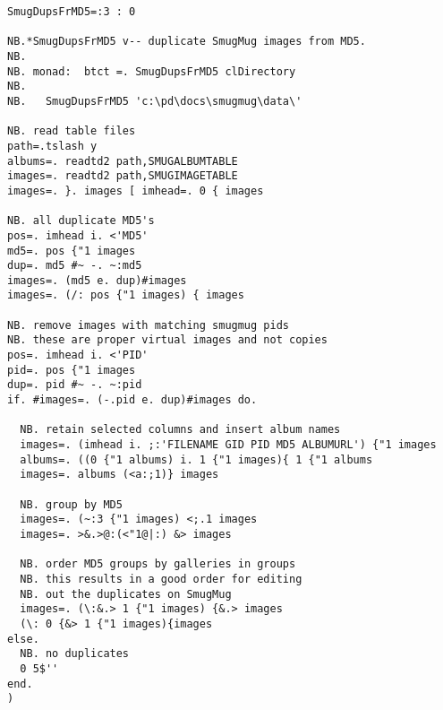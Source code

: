 \begin{tcolorbox}[breakable, size=fbox, boxrule=1pt, pad at break*=1mm,colback=cellbackground, colframe=cellborder]
\begin{lstlisting}[language=jdoc, frame=single,framerule=0pt,label=lst:scr369X0]
SmugDupsFrMD5=:3 : 0

NB.*SmugDupsFrMD5 v-- duplicate SmugMug images from MD5.
NB.
NB. monad:  btct =. SmugDupsFrMD5 clDirectory
NB.
NB.   SmugDupsFrMD5 'c:\pd\docs\smugmug\data\'

NB. read table files
path=.tslash y
albums=. readtd2 path,SMUGALBUMTABLE
images=. readtd2 path,SMUGIMAGETABLE
images=. }. images [ imhead=. 0 { images

NB. all duplicate MD5's
pos=. imhead i. <'MD5'
md5=. pos {"1 images
dup=. md5 #~ -. ~:md5
images=. (md5 e. dup)#images
images=. (/: pos {"1 images) { images

NB. remove images with matching smugmug pids
NB. these are proper virtual images and not copies
pos=. imhead i. <'PID'
pid=. pos {"1 images
dup=. pid #~ -. ~:pid
if. #images=. (-.pid e. dup)#images do.

  NB. retain selected columns and insert album names
  images=. (imhead i. ;:'FILENAME GID PID MD5 ALBUMURL') {"1 images
  albums=. ((0 {"1 albums) i. 1 {"1 images){ 1 {"1 albums
  images=. albums (<a:;1)} images

  NB. group by MD5
  images=. (~:3 {"1 images) <;.1 images
  images=. >&.>@:(<"1@|:) &> images

  NB. order MD5 groups by galleries in groups
  NB. this results in a good order for editing
  NB. out the duplicates on SmugMug
  images=. (\:&.> 1 {"1 images) {&.> images
  (\: 0 {&> 1 {"1 images){images
else.
  NB. no duplicates
  0 5$''
end.
)
\end{lstlisting}
\end{tcolorbox}



%